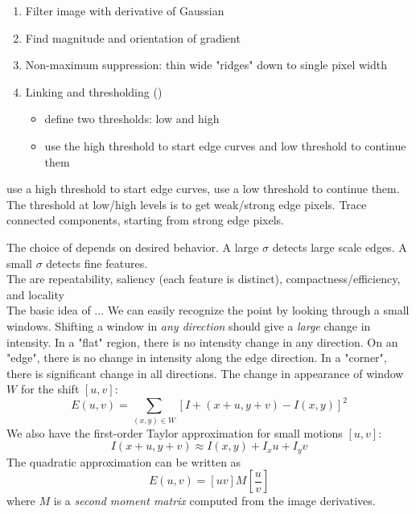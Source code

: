 \documentclass{article}
\begin{document}
\begin{definition}
  \begin{enumerate}
    \item Filter image with derivative of Gaussian 
    \item Find magnitude and orientation of gradient 
    \item Non-maximum suppression: thin wide "ridges" down to single pixel width 
    \item Linking and thresholding () 
      \begin{itemize}
        \item define two thresholds: low and high 
        \item use the high threshold to start edge curves and low threshold to continue them
      \end{itemize}
  \end{enumerate}
\end{definition}

\begin{definition}
  use a high threshold to start edge curves, use a low threshold to continue them. The threshold at low/high levels is to get weak/strong edge pixels. Trace connected components, starting from strong edge pixels. 
\end{definition}

The choice of  depends on desired behavior. A large $\sigma$ detects large scale edges. A small $\sigma$ detects fine features. \\ 

The  are repeatability, saliency (each feature is distinct), compactness/efficiency, and locality \\ 

The basic idea of $\dots$ We can easily recognize the point by looking through a small windows. Shifting a window in \emph{any direction} should give a \emph{large} change in intensity. In a "flat" region, there is no intensity change in any direction. On an "edge", there is no change in intensity along the edge direction. In a "corner", there is significant change in all directions. The change in appearance of window $W$ for the shift $[u,v]$: $$E(u,v) = \sum_{(x,y) \in W} [I + (x + u, y + v) - I(x,y)]^2$$ We also have the first-order Taylor approximation for small motions $[u,v]$: $$I(x + u, y + v) \approx I(x,y) + I_x u + I_y v$$ The quadratic approximation can be written as $$E(u,v) = [ u v ]M [ \frac{u}{v} ]$$ where $M$ is a \emph{second moment matrix} computed from the image derivatives. 
\end{document}
